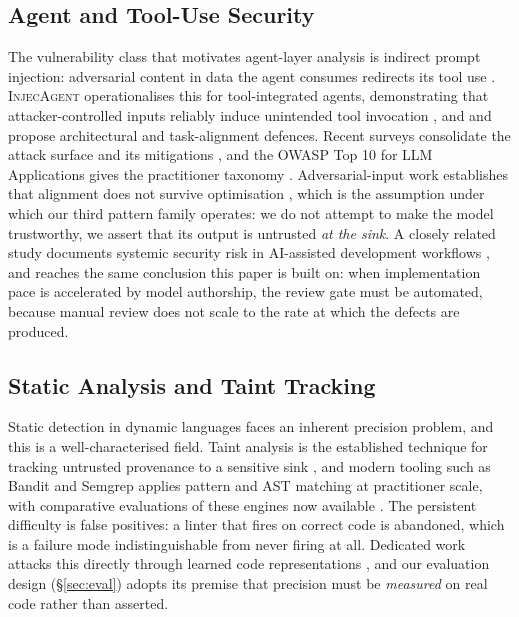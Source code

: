 \subsection{Agent and Tool-Use Security}

The vulnerability class that motivates agent-layer analysis is indirect prompt
injection: adversarial content in data the agent consumes redirects its
tool use \cite{greshake2023notwhat}. \textsc{InjecAgent} operationalises this
for tool-integrated agents, demonstrating that attacker-controlled inputs
reliably induce unintended tool invocation \cite{zhan2024injecagent}, and
\cite{chen2024struq} and \cite{jia2025taskshield} propose architectural and
task-alignment defences. Recent surveys consolidate the attack surface and its
mitigations \cite{cao2026survey}, and the {OWASP} Top 10 for LLM Applications
gives the practitioner taxonomy \cite{owasp2024llm}. Adversarial-input work
establishes that alignment does not survive optimisation \cite{zou2023universal},
which is the assumption under which our third pattern family operates: we do not
attempt to make the model trustworthy, we assert that its output is
untrusted \emph{at the sink}. A closely related study documents systemic
security risk in AI-assisted development workflows \cite{gandhi2026vibecoding},
and reaches the same conclusion this paper is built on: when implementation pace
is accelerated by model authorship, the review gate must be automated, because
manual review does not scale to the rate at which the defects are produced.

\subsection{Static Analysis and Taint Tracking}

Static detection in dynamic languages faces an inherent precision problem, and
this is a well-characterised field. Taint analysis is the established technique
for tracking untrusted provenance to a sensitive sink
\cite{shimchik2019taint,liu2025bidirectional}, and modern tooling such as
Bandit \cite{bandit2024} and Semgrep applies pattern and AST matching at
practitioner scale, with comparative evaluations of these engines now available
\cite{borlakova2026comparative}. The persistent difficulty is false positives:
a linter that fires on correct code is abandoned, which is a failure mode
indistinguishable from never firing at all. Dedicated work attacks this
directly through learned code representations \cite{yang2024falsepositives},
and our evaluation design (\S\ref{sec:eval}) adopts its premise that
precision must be \emph{measured} on real code rather than asserted.

